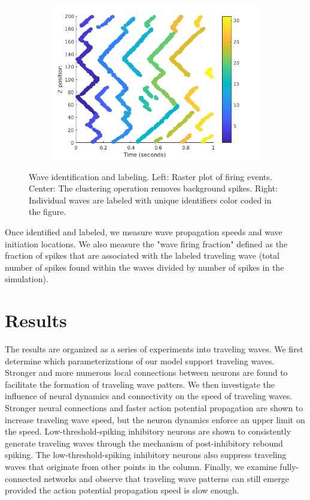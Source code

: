 \documentclass[a4paper,11pt]{article}
\begin{document}
\begin{figure}[!htb]
\begin{subfigure}{0.33\textwidth}
  \includegraphics[width=\textwidth]{fig/2x2_wave_IDs}
 \end{subfigure}%
 \caption{Wave identification and labeling. Left: Raster plot of firing events. Center: The clustering operation removes background spikes. Right: Individual waves are labeled with unique identifiers color coded in the figure.}
 \label{fig:wave_analysis}
\end{figure}

Once identified and labeled, we measure wave propagation speeds and wave initiation locations. 
We also measure the "wave firing fraction" defined as the fraction of spikes that are associated with the labeled traveling wave (total number of spikes found within the waves divided by number of spikes in the simulation). 

\FloatBarrier

\section{Results}
The results are organized as a series of experiments into traveling waves.
We first determine which parameterizations of our model support traveling waves.
Stronger and more numerous local connections between neurons are found to facilitate the formation of traveling wave patters.
We then investigate the influence of neural dynamics and connectivity on the speed of traveling waves.
Stronger neural connections and faster action potential propagation are shown to increase traveling wave speed, but the neuron dynamics enforce an upper limit on the speed. 
Low-threshold-spiking inhibitory neurons are shown to consistently generate traveling waves through the mechanism of post-inhibitory rebound spiking.
The low-threshold-spiking inhibitory neurons also suppress traveling waves that originate from other points in the column.
Finally, we examine fully-connected networks and observe that traveling wave patterns can still emerge provided the action potential propagation speed is slow enough.
\end{document}
